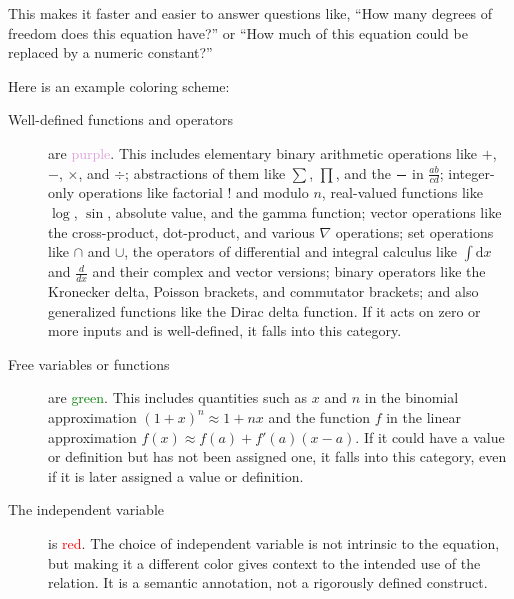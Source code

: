 \documentclass[12pt,letterpaper]{article}
\begin{document}
This makes it faster and easier to answer questions like,
``How many degrees of freedom does this equation have?''
or
``How much of this equation could be replaced by a numeric constant?''

Here is an example coloring scheme:

\begin{description}
\item[Well-defined functions and operators] are \textcolor{Plum}{purple}.
      This includes elementary binary arithmetic operations like $+$, $-$, $\times$, and $\div$;
      abstractions of them like $\sum$, $\prod$, and the $\frac{\hspace{1em}}{\hspace{1em}}$ in $\frac{ab}{cd}$;
      integer-only operations like factorial $!$ and modulo $n$,
      real-valued functions like $\log$, $\sin$, absolute value, and the gamma function;
      vector operations like the cross-product, dot-product, and various $\nabla$ operations;
      set operations like $\cap$ and $\cup$,
      the operators of differential and integral calculus like $\int \mathrm{d}x$ and $\frac{d}{dx}$ and their complex and vector versions;
      binary operators like the Kronecker delta, Poisson brackets, and commutator brackets;
      and also generalized functions like the Dirac delta function.
      If it acts on zero or more inputs and is well-defined,
      it falls into this category.
\item[Free variables or functions] are \textcolor{green}{green}. This includes quantities such as $x$ and $n$ in the binomial approximation $(1+x)^n \approx 1 + nx$
      and the function $f$ in the linear approximation $f(x) \approx f(a) + f'(a)(x-a)$.
      If it could have a value or definition but has not been assigned one,
      it falls into this category,
      even if it is later assigned a value or definition.
\item[The independent variable] is \textcolor{red}{red}.
      The choice of independent variable is not intrinsic to the equation,
      but making it a different color gives context to the intended use of the relation.
      It is a semantic annotation,
      not a rigorously defined construct.


\end{description}
\end{document}
